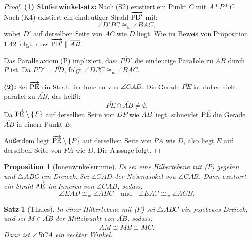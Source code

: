 \documentclass[a4paper,12pt]{article}
\theoremstyle{break}
\newtheorem{theorem}[definition]{Satz}
\newtheorem{proposition}[definition]{Proposition}
\begin{document}
\begin{proof}
\textbf{(1) Stufenwinkelsatz:}  
Nach (S2) existiert ein Punkt \(C\) mit \(A * P * C\). Nach (K4) existiert ein eindeutiger Strahl \(\overrightarrow{\rm PD'}\) mit:
\[
\angle D'PC \cong_w \angle BAC,
\]
wobei \(D'\) auf derselben Seite von \(\overline{AC}\) wie \(D\) liegt. Wie im Beweis von Proposition 1.42 folgt, dass \(\overrightarrow{\rm PD'} \parallel \overline{AB}\).  

Das Parallelaxiom (P) impliziert, dass \(\overline{PD'}\) die eindeutige Parallele zu \(\overline{AB}\) durch \(P\) ist. Da \(\overline{PD'} = \overline{PD}\), folgt \(\angle DPC \cong_w \angle BAC\).  

\textbf{(2):}  
Sei \(\overrightarrow{\rm PE}\) ein Strahl im Inneren von \(\angle CAD\). Die Gerade \(\overline{PE}\) ist daher nicht parallel zu \(\overline{AB}\), das heißt:
\[
\overline{PE} \cap \overline{AB} \neq \emptyset.
\]
Da \(\overrightarrow{\rm PE} \setminus \{P\}\) auf derselben Seite von \(\overline{DP}\) wie \(\overline{AB}\) liegt, schneidet \(\overrightarrow{\rm PE}\) die Gerade \(\overline{AB}\) in einem Punkt \(E\).  

Außerdem liegt \(\overrightarrow{\rm PE} \setminus \{P\}\) auf derselben Seite von \(\overline{PA}\) wie \(D\), also liegt \(E\) auf derselben Seite von \(\overline{PA}\) wie \(D\). Die Aussage folgt.
\end{proof}

\begin{proposition}[Innenwinkelsumme]\label{prop:innenwinkelsumme}
Es sei eine Hilbertebene mit (P) gegeben und \(\triangle ABC\) ein Dreieck. Sei \(\angle CAD\) der Nebenwinkel von \(\angle CAB\). Dann existiert ein Strahl \(\overrightarrow{\rm AE}\) im Inneren von \(\angle CAD\), sodass:
\[
\angle EAD \cong_w \angle ABC \quad \text{und} \quad \angle EAC \cong_w \angle ACB.
\]
\end{proposition}

\begin{theorem}[Thales]
In einer Hilbertebene mit (P) sei \(\triangle ABC\) ein gegebenes Dreieck, und sei \(M \in \overline{AB}\) der Mittelpunkt von \(\overline{AB}\), sodass:
\[
\overline{AM} \cong \overline{MB} \cong \overline{MC}.
\]
Dann ist \(\angle BCA\) ein rechter Winkel.
\end{theorem}
\end{document}
